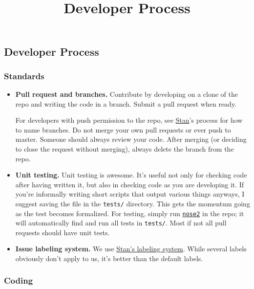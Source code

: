 \title{Developer Process}

\subsection{Developer Process}

\subsubsection{Standards}

\begin{itemize}
\item
  \textbf{Pull request and branches.}
  Contribute by developing on a clone of the repo and writing the code
  in a branch. Submit a pull request when ready.

  For developers with push permission to the repo, see
  \href{http://mc-stan.org/}{Stan}'s process for how to name branches.
  Do not merge your own pull requests or ever push to master. Someone
  should always review your code.  After merging (or deciding to
  close the request without merging), always delete the branch from
  the repo.
\item
  \textbf{Unit testing.} Unit testing is awesome. It's useful not only
  for checking code after having written it, but also in checking code
  as you are developing it. If you're informally writing short scripts
  that output various things anyways, I suggest saving the file in the
  \texttt{tests/} directory. This gets the momentum going as the test
  becomes formalized. For testing, simply run
  \href{http://nose2.readthedocs.io/en/latest/getting_started.html}{\texttt{nose2}}
  in the repo; it will automatically find and run all tests in
  \texttt{tests/}. Most if not all pull requests should have unit tests.
\item
  \textbf{Issue labeling system.} We use
  \href{https://github.com/stan-dev/stan/pulls}{Stan's labeling system}.
  While several labels obviously don't apply to us, it's better than the
  default labels.
\end{itemize}

\subsubsection{Coding}

